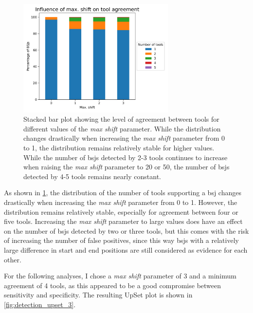 \begin{figure}[H]
    \centering

    \includegraphics[width=0.7\textwidth]{chapters/4_results_and_discussion/figures/detection/shift_agreement.png}
    \caption{Stacked bar plot showing the level of agreement between tools for
        different values of the \textit{max shift} parameter.
        While the distribution changes drastically when increasing the \textit{max
            shift} parameter from 0 to 1, the distribution remains relatively stable for
        higher values.
        While the number of \glspl{bsj} detected by 2-3 tools continues to increase
        when raising the \textit{max shift} parameter to 20 or 50, the number of
        \glspl{bsj} detected by 4-5 tools remains nearly constant.
    }
    \label{fig:shift_agreement}
\end{figure}

As shown in \cref{fig:shift_agreement}, the distribution of the number of tools
supporting a \gls{bsj} changes drastically when increasing the \textit{max
    shift} parameter from 0 to 1.
However, the distribution remains relatively stable, especially for agreement
between four or five tools.
Increasing the \textit{max shift} parameter to large values does have an effect
on the number of \glspl{bsj} detected by two or three tools, but this comes
with the risk of increasing the number of false positives, since this way
\glspl{bsj} with a relatively large difference in start and end positions are
still considered as evidence for each other.

For the following analyses, I chose a \textit{max shift} parameter of 3 and a
minimum agreement of 4 tools, as this appeared to be a good compromise between
sensitivity and specificity.
The resulting UpSet plot is shown in \cref{fig:detection_upset_3}.

